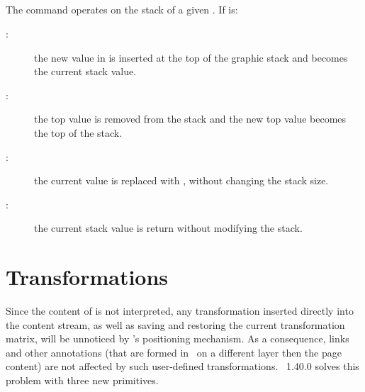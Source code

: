 \documentclass{pdftexmanual}
\begin{document}
\subsection{}
\noindent {} \Means
   \Or {} \Or {} \Or {}

The command operates on the stack of a given .
If  is:

\begin{description}
\item[:] the new value in  is inserted at
the top of the graphic stack and becomes the current stack value.

\item[:] the top value is removed from the stack and the new
top value becomes the top of the stack.

\item[:] the current value is replaced with
, without changing the stack size.

\item[:] the current stack value is return without
modifying the stack.
\end{description}


\section{Transformations}

Since the content of  is not interpreted, any
transformation inserted directly into the content stream, as well as
saving and restoring the current transformation matrix, will be
unnoticed by \PDFTEX's positioning mechanism. As a consequence, links
and other annotations (that are formed in \PDF\ on a different layer
then the page content) are not affected by such user-defined
transformations. \PDFTEX\ 1.40.0 solves this problem with three new
primitives.

\subsection{}
\end{document}
